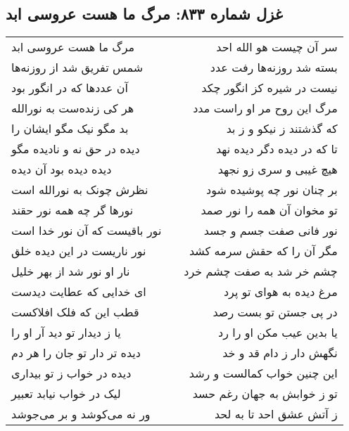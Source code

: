 \begin{center}
\section*{غزل شماره ۸۳۳: مرگ ما هست عروسی ابد}
\label{sec:0833}
\begin{longtable}{l p{0.5cm} r}
مرگ ما هست عروسی ابد
&&
سر آن چیست هو الله احد
\\
شمس تفریق شد از روزنه‌ها
&&
بسته شد روزنه‌ها رفت عدد
\\
آن عددها که در انگور بود
&&
نیست در شیره کز انگور چکد
\\
هر کی زنده‌ست به نورالله
&&
مرگ این روح مر او راست مدد
\\
بد مگو نیک مگو ایشان را
&&
که گذشتند ز نیکو و ز بد
\\
دیده در حق نه و نادیده مگو
&&
تا که در دیده دگر دیده نهد
\\
دیده دیده بود آن دیده
&&
هیچ غیبی و سری زو نجهد
\\
نظرش چونک به نورالله است
&&
بر چنان نور چه پوشیده شود
\\
نورها گر چه همه نور حقند
&&
تو مخوان آن همه را نور صمد
\\
نور باقیست که آن نور خدا است
&&
نور فانی صفت جسم و جسد
\\
نور ناریست در این دیده خلق
&&
مگر آن را که حقش سرمه کشد
\\
نار او نور شد از بهر خلیل
&&
چشم خر شد به صفت چشم خرد
\\
ای خدایی که عطایت دیدست
&&
مرغ دیده به هوای تو پرد
\\
قطب این که فلک افلاکست
&&
در پی جستن تو بست رصد
\\
یا ز دیدار تو دید آر او را
&&
یا بدین عیب مکن او را رد
\\
دیده تر دار تو جان را هر دم
&&
نگهش دار ز دام قد و خد
\\
دیده در خواب ز تو بیداری
&&
این چنین خواب کمالست و رشد
\\
لیک در خواب نیابد تعبیر
&&
تو ز خوابش به جهان رغم حسد
\\
ور نه می‌کوشد و بر می‌جوشد
&&
ز آتش عشق احد تا به لحد
\\
\end{longtable}
\end{center}
